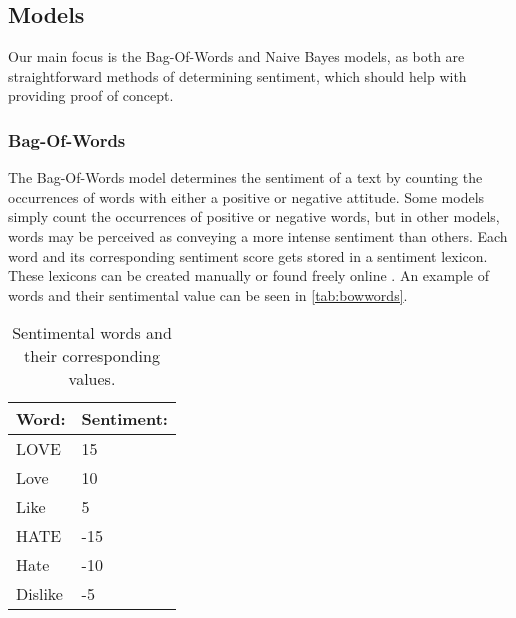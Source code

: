 \subsection{Models}\label{subsub:Models}
% 

Our main focus is the Bag-Of-Words and Naive Bayes models, as both
are straightforward methods of determining sentiment, which should help with
providing proof of concept.

\subsubsection{Bag-Of-Words}
The Bag-Of-Words model determines the sentiment of a text by counting the
occurrences of words with either a positive or negative attitude. Some models
simply count the occurrences of positive or negative words, but in other
models, words may be perceived as conveying a more intense sentiment than others. Each
word and its corresponding sentiment score gets stored in a sentiment lexicon.
These lexicons can be created manually or found freely online
\citep{BagOfWords}. An example of words and their sentimental value can be seen
in \autoref{tab:bowwords}.

\begin{table}[H]\centering
\begin{tabular}{|l|l|}\hline
\textbf{Word:} & \textbf{Sentiment:} \\\hline
LOVE	&	15	\\\hline
Love	&	10	\\\hline
Like	&	5	\\\hline
HATE	&	-15	\\\hline
Hate	&	-10	\\\hline
Dislike	&	-5	\\\hline
\end{tabular}
\caption{Sentimental words and their corresponding values.}
\label{tab:bowwords}
\end{table}

